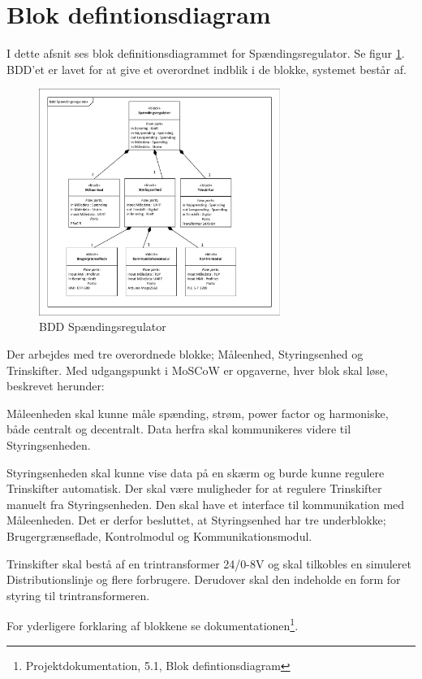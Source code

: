 
\section{Blok defintionsdiagram}

I dette afsnit ses blok definitionsdiagrammet for Spændingsregulator. Se figur \ref{fig:BDDSpaendingsregulator}. BDD'et er lavet for at give et overordnet indblik i de blokke, systemet består af.

\begin{figure}[H] %
	\centering
	\includegraphics[width=0.7\textwidth]{Figure/BDDSpaendingsregulator}
	\caption{BDD Spændingsregulator}
	\label{fig:BDDSpaendingsregulator}
\end{figure}

Der arbejdes med tre overordnede blokke; Måleenhed, Styringsenhed og Trinskifter. Med udgangspunkt i MoSCoW er opgaverne, hver blok skal løse, beskrevet herunder:


Måleenheden skal kunne måle spænding, strøm, power factor og harmoniske, både centralt og decentralt. Data herfra skal kommunikeres videre til Styringsenheden. 


Styringsenheden skal kunne vise data på en skærm og burde kunne regulere Trinskifter automatisk. Der skal være muligheder for at regulere Trinskifter manuelt fra Styringsenheden. Den skal have et interface til kommunikation med Måleenheden. Det er derfor besluttet, at Styringsenhed har tre underblokke; Brugergrænseflade, Kontrolmodul og Kommunikationsmodul.


Trinskifter skal bestå af en trintransformer 24/0-8V og skal tilkobles en simuleret Distributionslinje og flere forbrugere. Derudover skal den indeholde en form for styring til trintransformeren.


For yderligere forklaring af blokkene se dokumentationen\footnote{Projektdokumentation, 5.1, Blok defintionsdiagram}.